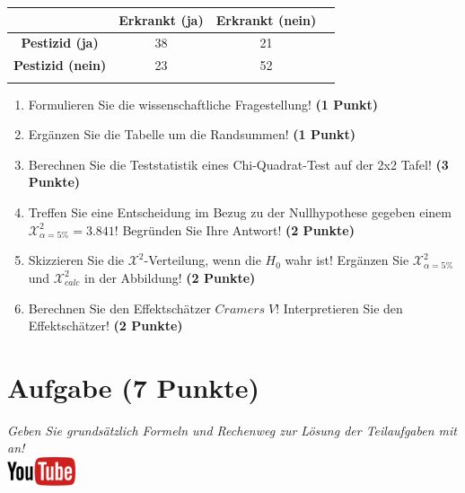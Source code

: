 \documentclass[a4paper, 9pt]{scrartcl}\usepackage[]{graphicx}\usepackage[]{xcolor}
\begin{document}
\begin{center}
  \Large
  \begin{tabular}{c|c|c|c}
     & \textbf{Erkrankt (ja)} & \textbf{Erkrankt (nein)} &  \strut\\
    \hline
    \textbf{Pestizid (ja)} & 38  & 21  &     \strut\\
    \hline
    \textbf{Pestizid (nein)} & 23  & 52  &      \strut\\
    \hline
     \phantom{100} & \phantom{100}  & \phantom{100}  &  \phantom{100}  \strut\\
  \end{tabular}
\end{center}

\vspace{5Ex}

\begin{enumerate}
\item Formulieren Sie die wissenschaftliche Fragestellung! \textbf{(1 Punkt)}
\item Erg{\"a}nzen Sie die Tabelle um die Randsummen! \textbf{(1 Punkt)} 
\item Berechnen Sie die Teststatistik eines Chi-Quadrat-Test auf der 2x2
  Tafel! \textbf{(3 Punkte)}
\item Treffen Sie eine Entscheidung im Bezug zu der Nullhypothese gegeben
  einem $\mathcal{X}^2_{\alpha = 5\%} = 3.841$! Begr{\"u}nden Sie Ihre Antwort!
  \textbf{(2 Punkte)}
\item Skizzieren Sie die $\mathcal{X}^2$-Verteilung, wenn die $H_0$ wahr
  ist! Erg{\"a}nzen Sie  $\mathcal{X}^2_{\alpha = 5\%}$ und
  $\mathcal{X}^2_{calc}$ in der Abbildung! \textbf{(2 Punkte)}
\item Berechnen Sie den Effektsch{\"a}tzer $Cramers\; V$! Interpretieren Sie den
  Effektsch{\"a}tzer! \textbf{(2 Punkte)}
\end{enumerate} 
\clearpage

\section{Aufgabe \hfill (7 Punkte)}

\textit{Geben Sie grunds{\"a}tzlich Formeln und Rechenweg zur L{\"o}sung der
  Teilaufgaben mit an!} \\[1Ex]

\hfill\href{https://youtu.be/jakM7fHyZfU}{\includegraphics[width =
  2cm]{img/youtube}}\\[1Ex]
\end{document}
